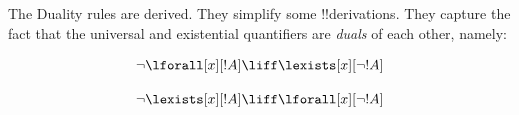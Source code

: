 \documentclass[../../../include/open-logic-section]{subfiles}
\begin{document}


\begin{explain}
    The Duality rules are derived. They simplify some !!{derivation}s.
    They capture the fact that the universal and
    existential quantifiers are \emph{duals} of each other, namely:

    $$\lnot\lforall[x][!A]\liff\lexists[x][\lnot!A]$$

    $$\lnot\lexists[x][!A]\liff\lforall[x][\lnot!A]$$
\end{explain}

\end{document}
